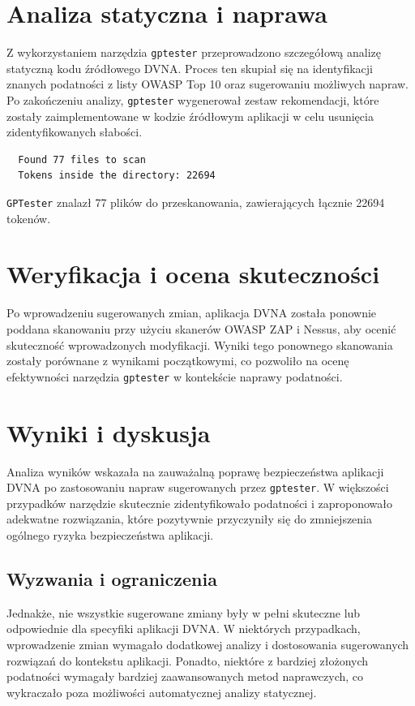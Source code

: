 \section{Analiza statyczna i naprawa}

Z wykorzystaniem narzędzia \texttt{gptester} przeprowadzono szczegółową analizę statyczną kodu źródłowego DVNA. Proces ten skupiał się na identyfikacji znanych podatności z listy OWASP Top 10 oraz sugerowaniu możliwych napraw. Po zakończeniu analizy, \texttt{gptester} wygenerował zestaw rekomendacji, które zostały zaimplementowane w kodzie źródłowym aplikacji w celu usunięcia zidentyfikowanych słabości.

\begin{verbatim}
  Found 77 files to scan
  Tokens inside the directory: 22694
\end{verbatim}

\texttt{GPTester} znalazł 77 plików do przeskanowania, zawierających łącznie 22694 tokenów. 

\section{Weryfikacja i ocena skuteczności}

Po wprowadzeniu sugerowanych zmian, aplikacja DVNA została ponownie poddana skanowaniu przy użyciu skanerów OWASP ZAP i Nessus, aby ocenić skuteczność wprowadzonych modyfikacji. Wyniki tego ponownego skanowania zostały porównane z wynikami początkowymi, co pozwoliło na ocenę efektywności narzędzia \texttt{gptester} w kontekście naprawy podatności.

\section{Wyniki i dyskusja}

Analiza wyników wskazała na zauważalną poprawę bezpieczeństwa aplikacji DVNA po zastosowaniu napraw sugerowanych przez \texttt{gptester}. W większości przypadków narzędzie skutecznie zidentyfikowało podatności i zaproponowało adekwatne rozwiązania, które pozytywnie przyczyniły się do zmniejszenia ogólnego ryzyka bezpieczeństwa aplikacji.

\subsection{Wyzwania i ograniczenia}

Jednakże, nie wszystkie sugerowane zmiany były w pełni skuteczne lub odpowiednie dla specyfiki aplikacji DVNA. W niektórych przypadkach, wprowadzenie zmian wymagało dodatkowej analizy i dostosowania sugerowanych rozwiązań do kontekstu aplikacji. Ponadto, niektóre z bardziej złożonych podatności wymagały bardziej zaawansowanych metod naprawczych, co wykraczało poza możliwości automatycznej analizy statycznej.


